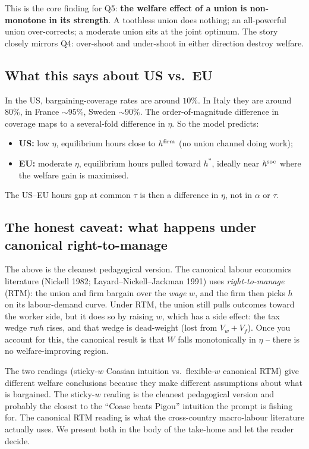 \documentclass[11pt,a4paper]{article}
\begin{document}
This is the core finding for Q5: \textbf{the welfare effect of a union
is non-monotone in its strength}. A toothless union does nothing; an
all-powerful union over-corrects; a moderate union sits at the joint
optimum. The story closely mirrors Q4: over-shoot and under-shoot in
either direction destroy welfare.

\subsection{What this says about US vs.\ EU}

In the US, bargaining-coverage rates are around $10\%$. In Italy they
are around $80\%$, in France $\sim\!95\%$, Sweden $\sim\!90\%$. The
order-of-magnitude difference in coverage maps to a several-fold
difference in $\eta$. So the model predicts:
\begin{itemize}
\item \textbf{US:} low $\eta$, equilibrium hours close to $h^{\rm firm}$
(no union channel doing work);
\item \textbf{EU:} moderate $\eta$, equilibrium hours pulled toward
$h^\ast$, ideally near $h^{\rm soc}$ where the welfare gain is maximised.
\end{itemize}
The US--EU hours gap at common $\tau$ is then a difference in $\eta$,
not in $\alpha$ or $\tau$.

\subsection{The honest caveat: what happens under canonical right-to-manage}

The above is the cleanest pedagogical version. The canonical labour
economics literature (Nickell 1982; Layard--Nickell--Jackman 1991) uses
\emph{right-to-manage} (RTM): the union and firm bargain over the
\emph{wage} $w$, and the firm then picks $h$ on its labour-demand
curve. Under RTM, the union still pulls outcomes toward the worker
side, but it does so by raising $w$, which has a side effect: the tax
wedge $\tau wh$ rises, and that wedge is dead-weight (lost from
$V_w+V_f$). Once you account for this, the canonical result is that
$W$ falls monotonically in $\eta$ -- there is no welfare-improving
region.

The two readings (sticky-$w$ Coasian intuition vs.\ flexible-$w$
canonical RTM) give different welfare conclusions because they make
different assumptions about what is bargained. The sticky-$w$ reading
is the cleanest pedagogical version and probably the closest to the
``Coase beats Pigou'' intuition the prompt is fishing for. The
canonical RTM reading is what the cross-country macro-labour
literature actually uses. We present both in the body of the take-home
and let the reader decide.
\end{document}

